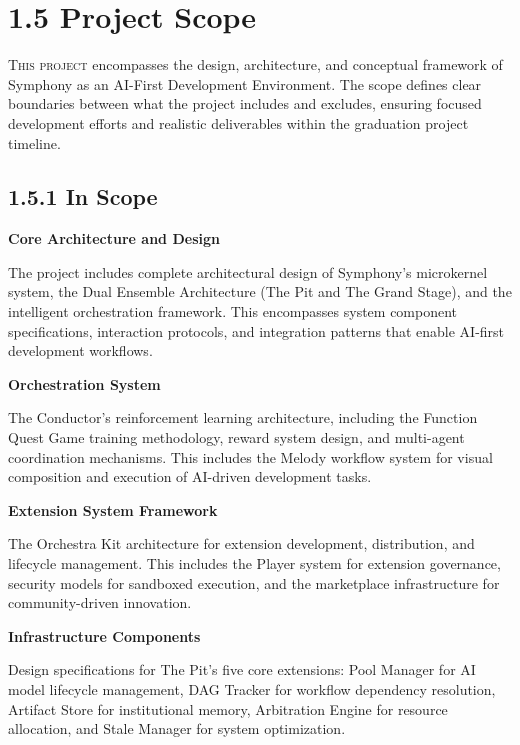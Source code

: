 
\clearpage
\section{1.5 Project Scope}
\label{sec:scope}

\lettrine{T}{his project} encompasses the design, architecture, and conceptual framework of Symphony as an AI-First Development Environment. The scope defines clear boundaries between what the project includes and excludes, ensuring focused development efforts and realistic deliverables within the graduation project timeline.

\subsection*{1.5.1 In Scope}

\textbf{Core Architecture and Design}

The project includes complete architectural design of Symphony's microkernel system, the Dual Ensemble Architecture (The Pit and The Grand Stage), and the intelligent orchestration framework. This encompasses system component specifications, interaction protocols, and integration patterns that enable AI-first development workflows.

\textbf{Orchestration System}

The Conductor's reinforcement learning architecture, including the Function Quest Game training methodology, reward system design, and multi-agent coordination mechanisms. This includes the Melody workflow system for visual composition and execution of AI-driven development tasks.

\textbf{Extension System Framework}

The Orchestra Kit architecture for extension development, distribution, and lifecycle management. This includes the Player system for extension governance, security models for sandboxed execution, and the marketplace infrastructure for community-driven innovation.

\textbf{Infrastructure Components}

Design specifications for The Pit's five core extensions: Pool Manager for AI model lifecycle management, DAG Tracker for workflow dependency resolution, Artifact Store for institutional memory, Arbitration Engine for resource allocation, and Stale Manager for system optimization.

